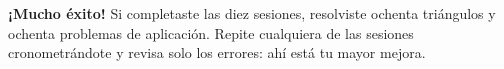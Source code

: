 \documentclass[12pt, letterpaper]{article}
\begin{document}
\vspace{10pt}
\begin{cuadroinfo}
  \small
  \textbf{¡Mucho éxito!} Si completaste las diez sesiones, resolviste ochenta triángulos y ochenta problemas de aplicación. Repite cualquiera de las sesiones cronometrándote y revisa solo los errores: ahí está tu mayor mejora.
\end{cuadroinfo}

\fi
\end{document}
